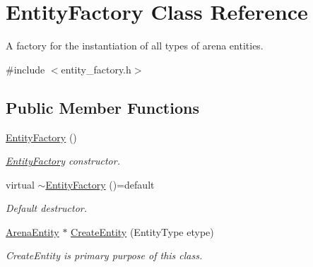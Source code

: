 \hypertarget{class_entity_factory}{}\section{Entity\+Factory Class Reference}
\label{class_entity_factory}


A factory for the instantiation of all types of arena entities.  




{\ttfamily \#include $<$entity\+\_\+factory.\+h$>$}

\subsection*{Public Member Functions}
\begin{DoxyCompactItemize}
\item 
\mbox{\hyperlink{class_entity_factory_abaf0c4ceaa682e55f69b0ceae230008a}{Entity\+Factory}} ()
\begin{DoxyCompactList}\small\item\em \mbox{\hyperlink{class_entity_factory}{Entity\+Factory}} constructor. \end{DoxyCompactList}\item 
\mbox{\label{class_entity_factory_ae3246f06fa101178803f76582323d4ad}} 
virtual \mbox{\hyperlink{class_entity_factory_ae3246f06fa101178803f76582323d4ad}{$\sim$\+Entity\+Factory}} ()=default
\begin{DoxyCompactList}\small\item\em Default destructor. \end{DoxyCompactList}\item 
\mbox{\hyperlink{class_arena_entity}{Arena\+Entity}} $\ast$ \mbox{\hyperlink{class_entity_factory_abf7b1ac4ec275728b47c37fcd85f81e8}{Create\+Entity}} (Entity\+Type etype)
\begin{DoxyCompactList}\small\item\em Create\+Entity is primary purpose of this class. \end{DoxyCompactList}\end{DoxyCompactItemize}
